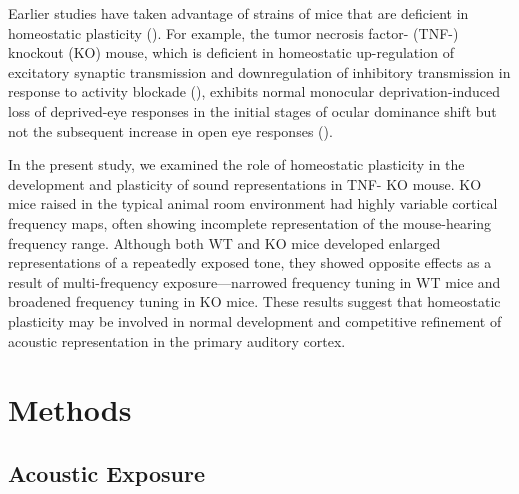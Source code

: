 Earlier studies have taken advantage of strains of mice that are deficient in homeostatic plasticity (\cite{Kaneko2008, Ranson2012}). For example, the tumor necrosis factor-\textalpha{} (TNF-\textalpha{}) knockout (KO) mouse, which is deficient in homeostatic up-regulation of excitatory synaptic transmission and downregulation of inhibitory transmission in response to activity blockade (\cite{Stellwagen2006, Kaneko2008}), exhibits normal monocular deprivation-induced loss of deprived-eye responses in the initial stages of ocular dominance shift but not the subsequent increase in open eye responses (\cite{Kaneko2008}).

In the present study, we examined the role of homeostatic plasticity in the development and plasticity of sound representations in TNF-\textalpha{} KO mouse. KO mice raised in the typical animal room environment had highly variable cortical frequency maps, often showing incomplete representation of the mouse-hearing frequency range. Although both WT and KO mice developed enlarged representations of a repeatedly exposed tone, they showed opposite effects as a result of multi-frequency exposure---narrowed frequency tuning in WT mice and broadened frequency tuning in KO mice. These results suggest that homeostatic plasticity may be involved in normal development and competitive refinement of acoustic representation in the primary auditory cortex.

\section{Methods}

\subsection{Acoustic Exposure}

